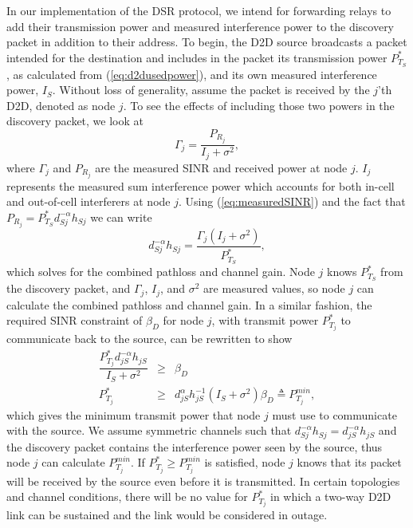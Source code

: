 \documentclass[10pt, final, journal, letterpaper,oneside, twocolumn]{IEEEtran}
\begin{document}
In our implementation of the DSR protocol, we intend for forwarding relays to add their transmission power and measured interference power to the discovery packet in addition to their address.  To begin, the D2D source broadcasts a packet intended for the destination and includes in the packet its transmission power $P_{T_{S}}^*$, as calculated from (\ref{eq:d2dusedpower}), and its own measured interference power, $I_{S}$.  Without loss of generality, assume the packet is received by the $j$'th D2D, denoted as node $j$.  To see the effects of including those two powers in the discovery packet, we look at
\begin{equation}
\Gamma_{j} = \dfrac{P_{R_{j}}}{I_{j} + \sigma^2},
\label{eq:measuredSINR}
\end{equation}
where $\Gamma_{j}$ and $P_{R_{j}}$ are the measured SINR and received power at node $j$.  $I_j$ represents the measured sum interference power which accounts for both in-cell and out-of-cell interferers at node $j$.  Using (\ref{eq:measuredSINR}) and the fact that $P_{R_{j}} = P_{T_{S}}^{*} d_{Sj}^{-\alpha} h_{Sj}$ we can write
\begin{equation}
d_{Sj}^{-\alpha} h_{Sj}= \dfrac{\Gamma_{j}(I_{j}+\sigma^2)}{P_{T_{S}}^{*}}, 
\label{eq:channel_power}
\end{equation}
which solves for the combined pathloss and channel gain.  Node $j$ knows $P_{T_{S}}^{*}$ from the discovery packet, and $\Gamma_{j}$, $I_{j}$, and $\sigma^2$ are measured values, so node $j$ can calculate the combined pathloss and channel gain.  In a similar fashion, the required SINR constraint of $\beta_D$ for node $j$, with transmit power $P_{T_{j}}^{*}$ to communicate back to the source, can be rewritten to show
\begin{eqnarray} 
\dfrac{P_{T_{j}}^{*} d_{jS}^{-\alpha} h_{jS}}{I_{S}+\sigma^2} &\geq& \beta_D \nonumber
\\
P_{T_{j}}^{*} &\geq& d_{jS}^{\alpha}h_{jS}^{-1}(I_{S} + \sigma^2)\beta_{D} \triangleq P_{T_{j}}^{min},  
\label{eq:ptdbound}
\end{eqnarray}
which gives the minimum transmit power that node $j$ must use to communicate with the source.  We assume symmetric channels such that $d_{Sj}^{-\alpha} h_{Sj} = d_{jS}^{-\alpha} h_{jS}$ and the discovery packet contains the interference power seen by the source, thus node $j$ can calculate $P_{T_{j}}^{min}$.  If $P_{T_{j}}^{*} \geq P_{T_{j}}^{min}$ is satisfied, node $j$ knows that its packet will be received by the source even before it is transmitted.  In certain topologies and channel conditions, there will be no value for $P_{T_{j}}^{*}$ in which a two-way D2D link can be sustained and the link would be considered in outage.  
\end{document}
